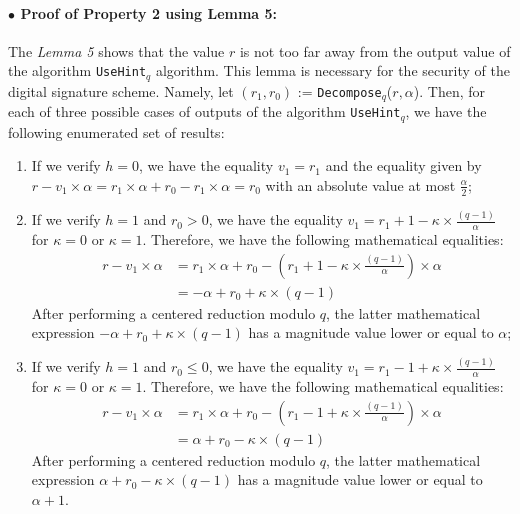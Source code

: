 \documentclass[runningheads]{llncs}
\numberwithin{equation}{section}
\begin{document}
    \paragraph{$\bullet$ \textbf{Proof of Property 2 using Lemma 5:}} The \textit{Lemma 5} shows that the value $r$ is not too far away from the output value of the algorithm \texttt{UseHint}${}_{q}$ algorithm. This lemma is necessary for the security of the digital signature scheme. Namely, let $({r}_{1}, {r}_{0})$ := \texttt{Decompose}${}_{q}$($r, \alpha$). Then, for each of three possible cases of outputs of the algorithm \texttt{UseHint}${}_{q}$, we have the following enumerated set of results:
    \begin{enumerate}
        \item If we verify $h = 0$, we have the equality ${v}_{1} = {r}_{1}$ and the equality given by $r - {v}_{1} \times \alpha = {r}_{1} \times \alpha + {r}_{0} - {r}_{1} \times \alpha = {r}_{0}$ with an absolute value at most $\frac{\alpha}{2}$;
        \item If we verify $h = 1$ and ${r}_{0} > 0$, we have the equality ${v}_{1} = {r}_{1} + 1 - \kappa \times \frac{(q - 1)}{\alpha}$ for $\kappa = 0$ or $\kappa = 1$. Therefore, we have the following mathematical equalities:
        \begin{equation*}
            \begin{split}
                r - {v}_{1} \times \alpha & = {r}_{1} \times \alpha + {r}_{0} - \left({r}_{1} + 1 - \kappa \times \frac{(q - 1)}{\alpha} \right) \times \alpha \\
                & = -\alpha + {r}_{0} + \kappa \times (q - 1)
            \end{split}
        \end{equation*}        
        After performing a centered reduction modulo $q$, the latter mathematical expression $-\alpha + {r}_{0} + \kappa \times (q - 1)$ has a magnitude value lower or equal to $\alpha$;
        \item If we verify $h = 1$ and ${r}_{0} \leq 0$, we have the equality ${v}_{1} = {r}_{1} - 1 + \kappa \times \frac{(q - 1)}{\alpha}$ for $\kappa = 0$ or $\kappa = 1$. Therefore, we have the following mathematical equalities:
        \begin{equation*}
            \begin{split}
                r - {v}_{1} \times \alpha & = {r}_{1} \times \alpha + {r}_{0} - \left({r}_{1} - 1 + \kappa \times \frac{(q - 1)}{\alpha} \right) \times \alpha \\
                & = \alpha + {r}_{0} - \kappa \times (q - 1)
            \end{split}
        \end{equation*}        
        After performing a centered reduction modulo $q$, the latter mathematical expression $\alpha + {r}_{0} - \kappa \times (q - 1)$ has a magnitude value lower or equal to $\alpha + 1$.
    \end{enumerate}
    
\end{document}
